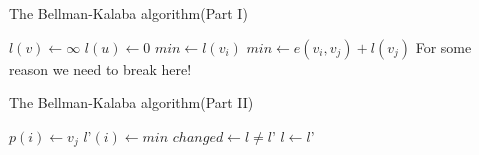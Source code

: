 \begin{algorithm}
\caption{The Bellman-Kalaba algorithm(Part I)} 
\begin{algorithmic}[1]
    \State $l(v) \leftarrow \infty$
  \EndFor
  \State $l(u) \leftarrow 0$
  \Repeat
      \State $min \leftarrow l(v_i)$ 
          \State $min \leftarrow e(v_i, v_j) + l(v_j)$ 
          \State \Comment For some reason we need to break here!
\end{algorithmic}
\end{algorithm}

\begin{algorithm}
\caption{The Bellman-Kalaba algorithm(Part II)} 
\begin{algorithmic}[1]
          \State $p(i) \leftarrow v_j$
        \EndIf
      \EndFor
      \State $l’(i) \leftarrow min$
    \EndFor
    \State $changed \leftarrow l \not= l’$
    \State $l \leftarrow l’$
\EndProcedure
\end{algorithmic}
\end{algorithm}